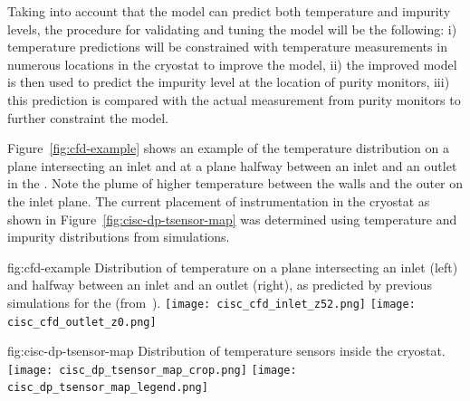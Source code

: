 Taking into account that the  model can predict both temperature and impurity levels, the procedure for validating and tuning the  model will be the following: i) temperature predictions will be constrained with temperature measurements in numerous locations in the cryostat to improve the  model, ii) the improved model is then used to predict the \lar impurity level at the location of purity monitors, iii) this prediction is compared with the actual measurement from purity monitors to further constraint the  model.  



Figure~\ref{fig:cfd-example} shows an example of the temperature
distribution on a plane intersecting an \lar inlet and at a
plane halfway between an inlet and an outlet in the .
Note the plume of higher temperature \lar between the walls and
the outer  on the inlet plane. The current placement of instrumentation in
the cryostat as shown in Figure~\ref{fig:cisc-dp-tsensor-map} was determined using temperature and impurity distributions from  simulations.

\begin{dunefigure}{fig:cfd-example}
  {Distribution of temperature on a plane intersecting an inlet (left) and halfway between an inlet and an outlet (right), as predicted by previous  simulations for the  (from~\cite{bib:docdb5915}).}
  \texttt{[image: cisc\_cfd\_inlet\_z52.png]}
  \texttt{[image: cisc\_cfd\_outlet\_z0.png]}
\end{dunefigure}

\begin{dunefigure}{fig:cisc-dp-tsensor-map}
  {Distribution of temperature sensors inside the cryostat.}
  \texttt{[image: cisc\_dp\_tsensor\_map\_crop.png]}
  \texttt{[image: cisc\_dp\_tsensor\_map\_legend.png]}
\end{dunefigure}


